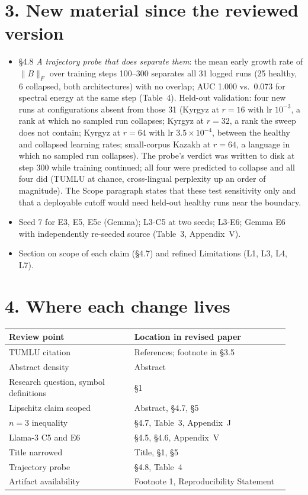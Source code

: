 \documentclass[11pt]{article}
\begin{document}
\section*{3. New material since the reviewed version}
\begin{itemize}
\item \S4.8 \emph{A trajectory probe that does separate them}: the mean early
growth rate of $\|B\|_F$ over training steps 100--300 separates all 31 logged
runs (25 healthy, 6 collapsed, both architectures) with no overlap; AUC
1.000 vs.\ 0.073 for spectral energy at the same step (Table~4).
Held-out validation: four new runs at configurations absent from those 31
(Kyrgyz at $r{=}16$ with lr $10^{-3}$, a rank at which no sampled run
collapses; Kyrgyz at $r{=}32$, a rank the sweep does not contain; Kyrgyz
at $r{=}64$ with lr $3.5{\times}10^{-4}$, between the healthy and collapsed
learning rates; small-corpus Kazakh at $r{=}64$, a language in which no
sampled run collapses). The probe's verdict was written to disk at step 300
while training continued; all four were predicted to collapse and all four
did
(TUMLU at chance, cross-lingual perplexity up an order of magnitude). The
Scope paragraph states that these test sensitivity only and that a
deployable cutoff would need held-out healthy runs near the boundary.
\item Seed 7 for E3, E5, E5c (Gemma); L3-C5 at two seeds; L3-E6; Gemma E6
with independently re-seeded source (Table~3, Appendix~V).
\item Section on scope of each claim (\S4.7) and refined Limitations (L1, L3,
L4, L7).
\end{itemize}

\section*{4. Where each change lives}
\begin{tabular}{@{}p{0.42\linewidth}p{0.52\linewidth}@{}}
\toprule
Review point & Location in revised paper \\
\midrule
TUMLU citation & References; footnote in \S3.5 \\
Abstract density & Abstract \\
Research question, symbol definitions & \S1 \\
Lipschitz claim scoped & Abstract, \S4.7, \S5 \\
$n{=}3$ inequality & \S4.7, Table~3, Appendix~J \\
Llama-3 C5 and E6 & \S4.5, \S4.6, Appendix~V \\
Title narrowed & Title, \S1, \S5 \\
Trajectory probe & \S4.8, Table~4 \\
Artifact availability & Footnote 1, Reproducibility Statement \\
\bottomrule
\end{tabular}
\end{document}
